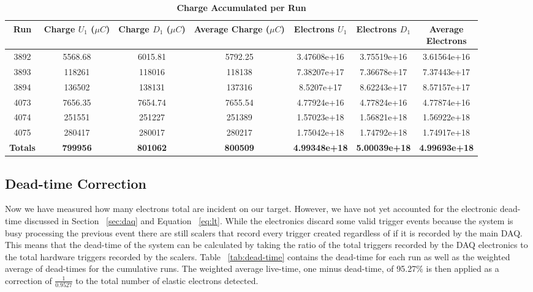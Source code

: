 \begin{table}[!h]
\centering
\begin{tabular}{|c c c c c c c|}
\hline
\textbf{Run} & \makecell{\textbf{Charge}\\ \textbf{$U_1$ ($\mu C$)}} & \makecell{\textbf{Charge}\\ \textbf{$D_1$ ($\mu C$)}} & \makecell{\textbf{Average}\\ \textbf{Charge}\\ ($\mu C$)} & \makecell{\textbf{Electrons} \\ $U_1$} & \makecell{\textbf{Electrons} \\ $D_1$} & \makecell{\textbf{Average} \\ \textbf{Electrons}}\\
\hline
3892 & 5568.68 & 6015.81 & 5792.25 & 3.47608e+16 & 3.75519e+16 & 3.61564e+16 \\
3893 & 118261 & 118016 & 118138 & 7.38207e+17 & 7.36678e+17 & 7.37443e+17 \\
3894 & 136502 & 138131 & 137316 & 8.5207e+17 & 8.62243e+17 & 8.57157e+17 \\
4073 & 7656.35 & 7654.74 & 7655.54 & 4.77924e+16 & 4.77824e+16 & 4.77874e+16 \\
4074 & 251551 & 251227 & 251389 & 1.57023e+18 & 1.56821e+18 & 1.56922e+18 \\
4075 & 280417 & 280017 & 280217 & 1.75042e+18 & 1.74792e+18 & 1.74917e+18 \\
\hline
\textbf{Totals} & \textbf{799956} & \textbf{801062} & \textbf{800509} & \textbf{4.99348e+18} & \textbf{5.00039e+18} & \textbf{4.99693e+18} \\
\hline
\end{tabular}
\caption{\bf{Charge Accumulated per Run}}
\label{tab:charges}
\end{table}

\subsection{Dead-time Correction}
\label{ssec:dead-time}

Now we have measured how many electrons total are incident on our target. However, we have not yet accounted for the electronic dead-time discussed in Section ~\ref{sec:daq} and Equation ~\ref{eq:lt}. While the electronics discard some valid trigger events because the system is busy processing the previous event there are still scalers that record every trigger created regardless of if it is recorded by the main DAQ. This means that the dead-time of the system can be calculated by taking the ratio of the total triggers recorded by the DAQ electronics to the total hardware triggers recorded by the scalers. Table ~\ref{tab:dead-time} contains the dead-time for each run as well as the weighted average of dead-times for the cumulative runs. The weighted average live-time, one minus dead-time, of 95.27$\%$ is then applied as a correction of $\frac{1}{0.9527}$ to the total number of elastic electrons detected.

